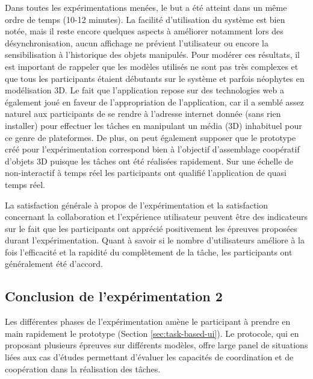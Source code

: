 Dans toutes les expérimentations menées, le but a été atteint dans 
un même ordre de temps (10-12 minutes). La facilité d'utilisation du système est 
bien notée, mais il reste encore quelques aspects à améliorer notamment lors des 
désynchronisation, aucun affichage ne prévient l'utilisateur ou encore la 
sensibilisation à l'historique des objets manipulés. 
Pour modérer ces résultats, il est important de rappeler que les modèles utilisés 
ne sont pas très complexes et que tous les participants étaient débutants sur le 
système et parfois néophytes en modélisation 3D.
Le fait que l'application repose sur des technologies web a également joué en 
faveur de l'appropriation de l'application, car il a semblé assez naturel aux 
participants de se rendre à l'adresse internet donnée (sans rien installer) pour 
effectuer les tâches en manipulant un média (3D) inhabituel pour ce genre de 
plateformes. 
De plus, on peut également supposer que le prototype créé pour l'expérimentation 
correspond bien à l'objectif d'assemblage coopératif d'objets \gls{3D} puisque les 
tâches ont été réalisées rapidement. Sur une échelle de \og non-interactif \fg{} à 
\og temps réel\fg{} les participants ont qualifié l'application de \og quasi temps 
réel\fg{}. 

La satisfaction générale à propos de l'expérimentation et la satisfaction concernant 
la collaboration et l'expérience utilisateur peuvent être des indicateurs sur le fait 
que les participants ont apprécié positivement les épreuves proposées durant 
l'expérimentation. 
Quant à savoir si le nombre d'utilisateurs améliore à la fois l'efficacité et la rapidité 
du complètement de la tâche, les participants ont généralement été d'accord.

\subsection{Conclusion de l'expérimentation 2}

Les différentes phases de l'expérimentation amène le participant à prendre en 
main rapidement le prototype (Section \ref{sec:task-based-ui}). 
Le protocole, qui en proposant plusieurs épreuves sur différents modèles, offre 
large panel de situations liées aux cas d'études permettant d'évaluer les capacités 
de coordination et de coopération dans la réalisation des tâches.


